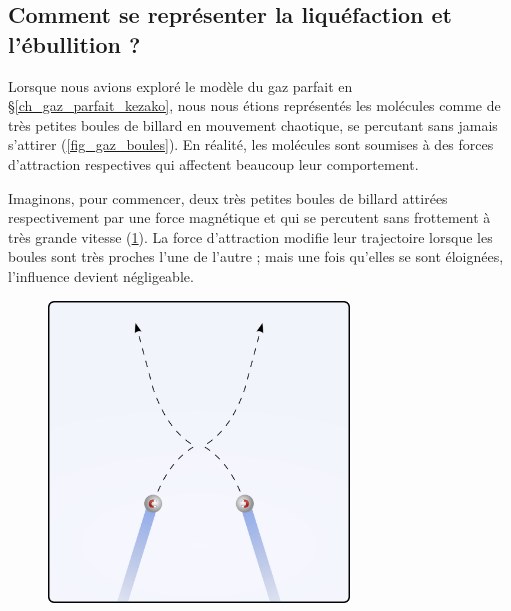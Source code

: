 		
		
	\subsection{Comment se représenter la liquéfaction et l’ébullition ?}
		
		Lorsque nous avions exploré le modèle du gaz parfait en \S\ref{ch_gaz_parfait_kezako}, nous nous étions représentés les molécules comme de très petites boules de billard en mouvement chaotique, se percutant sans jamais s’attirer (\cref{fig_gaz_boules}). En réalité, les molécules sont soumises à des forces d’attraction respectives qui affectent beaucoup leur comportement.
		
		Imaginons, pour commencer, deux très petites boules de billard attirées respectivement par une force magnétique et qui se percutent sans frottement à très grande vitesse (\cref{fig_billard_grande_vitesse}). La force d’attraction modifie leur trajectoire lorsque les boules sont très proches l’une de l’autre ; mais une fois qu’elles se sont éloignées, l’influence devient négligeable.

		
		\begin{figure}
			\begin{center}
				\includegraphics[width=8cm]{images/billard_rapide.png}
			\end{center}
  		\label{fig_billard_grande_vitesse}
		\end{figure}
	
